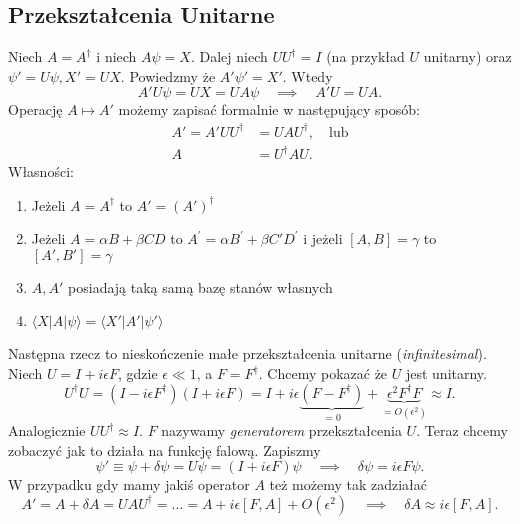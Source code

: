 \subsection{Przekształcenia Unitarne}
Niech $A = A^{\dagger}$ i niech $A \psi = X$. Dalej niech
$U U^{\dagger} = I$ (na przykład $U$ unitarny) oraz $\psi' = U \psi, X' = UX$.
Powiedzmy że $A' \psi' = X'$. Wtedy
\begin{equation*}
	A' U \psi = UX = UA\psi \quad \implies \quad  A'U = UA.
\end{equation*}
Operację $A \mapsto A'$ możemy zapisać
formalnie w następujący sposób:
\begin{align*}
		A' = A' U U^{\dagger} &= U A U^{\dagger}, \quad \text{lub}\\ 
		A &= U^{\dagger} A U.
\end{align*}
Własności:
\begin{enumerate}
	\item Jeżeli $A = A^{\dagger}$ to $A' = (A')^{\dagger}$
	\item Jeżeli $  A=\alpha B+\beta C D$ to $A^{\prime}=\alpha B^{\prime}+\beta C' D^{\prime}  $ i jeżeli $[A, B] = \gamma$ to $[A', B'] = \gamma$
	\item $A, A'$ posiadają taką samą bazę stanów własnych
	\item $\langle X | A | \psi \rangle = \langle X' | A' | \psi' \rangle$ 
\end{enumerate}
Następna rzecz to nieskończenie małe przekształcenia unitarne (\textit{infinitesimal}).
Niech $U = I + i \epsilon F$, gdzie $\epsilon \ll 1$, a $F = F^{\dagger}$. Chcemy pokazać że $U$ jest unitarny.
\begin{equation*}
	U^{\dagger} U = (I - i \epsilon F^{\dagger})(I + i \epsilon F) = I
        + i \epsilon\underbrace{(F - F^{\dagger})}_{= 0}
        + \underbrace{\epsilon^2F^{\dagger}F}_{=O(\epsilon^2)}
        \approx I.
\end{equation*}
Analogicznie $U U^{\dagger} \approx I$.
$F$ nazywamy \emph{generatorem} przekształcenia $U$.
Teraz chcemy zobaczyć jak to działa na funkcję falową.
Zapiszmy
$$\psi' \equiv \psi + \delta \psi = U \psi = (I + i \epsilon F)\psi
\quad \implies \quad
\delta \psi = i \epsilon F \psi.$$
W przypadku gdy mamy jakiś operator $A$ też możemy tak zadziałać
\begin{equation*}
	A' = A + \delta A = U A U^{\dagger} = \dotsc = A + i \epsilon [F, A] + O(\epsilon^2) 
    \quad \implies \quad \delta A \approx i \epsilon [F, A].
\end{equation*}
